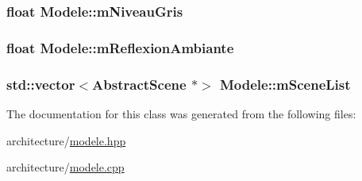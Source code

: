 \subsubsection[{\texorpdfstring{m\+Niveau\+Gris}{mNiveauGris}}]{\setlength{\rightskip}{0pt plus 5cm}float Modele\+::m\+Niveau\+Gris}\hypertarget{class_modele_a3ab26b711a9452193a341479b3294464}{}\label{class_modele_a3ab26b711a9452193a341479b3294464}
\subsubsection[{\texorpdfstring{m\+Reflexion\+Ambiante}{mReflexionAmbiante}}]{\setlength{\rightskip}{0pt plus 5cm}float Modele\+::m\+Reflexion\+Ambiante}\hypertarget{class_modele_ab60784b5eb94976da411711a10046d1d}{}\label{class_modele_ab60784b5eb94976da411711a10046d1d}
\subsubsection[{\texorpdfstring{m\+Scene\+List}{mSceneList}}]{\setlength{\rightskip}{0pt plus 5cm}std\+::vector$<${\bf Abstract\+Scene} $\ast$$>$ Modele\+::m\+Scene\+List}\hypertarget{class_modele_a5b1fde589f17e1f6a87c00022ae2821e}{}\label{class_modele_a5b1fde589f17e1f6a87c00022ae2821e}


The documentation for this class was generated from the following files\+:\begin{DoxyCompactItemize}
\item 
architecture/\hyperlink{modele_8hpp}{modele.\+hpp}\item 
architecture/\hyperlink{modele_8cpp}{modele.\+cpp}\end{DoxyCompactItemize}
